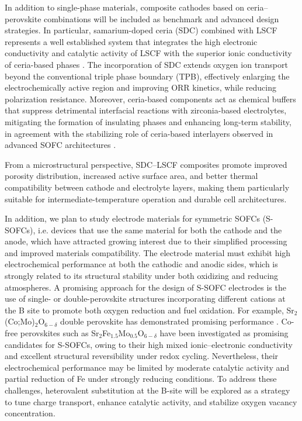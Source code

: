 In addition to single-phase materials, composite cathodes based on ceria–perovskite combinations will be included as benchmark and advanced design strategies. In particular, samarium-doped ceria (SDC) combined with LSCF represents a well established system that integrates the high electronic conductivity and catalytic activity of LSCF with the superior ionic conductivity of ceria-based phases \cite{MARINHA2012,SHIMURA2017}. The incorporation of SDC extends oxygen ion transport beyond the conventional triple phase boundary (TPB), effectively enlarging the electrochemically active region and improving ORR kinetics, while reducing polarization resistance. Moreover, ceria-based components act as chemical buffers that suppress detrimental interfacial reactions with zirconia-based electrolytes, mitigating the formation of insulating phases and enhancing long-term stability, in agreement with the stabilizing role of ceria-based interlayers observed in advanced SOFC architectures \cite{KAN2016,TAO2009}.

From a microstructural perspective, SDC–LSCF composites promote improved porosity distribution, increased active surface area, and better thermal compatibility between cathode and electrolyte layers, making them particularly suitable for intermediate-temperature operation and durable cell architectures.

In addition, we plan to study electrode materials for symmetric SOFCs (S-SOFCs), i.e. devices that use the same material for both the cathode and the anode, which have attracted growing interest due to their simplified processing and improved materials compatibility. The electrode material must exhibit high electrochemical performance at both the cathodic and anodic sides, which is strongly related to its structural stability under both oxidizing and reducing atmospheres. A promising approach for the design of S-SOFC electrodes is the use of single- or double-perovskite structures incorporating different cations at the B site to promote both oxygen reduction and fuel oxidation. For example, Sr$_2$(Co;Mo)$_2$O$_{6 -\delta}$ double perovskite has demonstrated promising performance \cite{Diego2024}. Co-free perovskites such as Sr$_{2}$Fe$_{1.5}$Mo$_{0.5}$O$_{6 -\delta}$ have been investigated as promising candidates for S-SOFCs, owing to their high mixed ionic–electronic conductivity and excellent structural reversibility under redox cycling. Nevertheless, their electrochemical performance may be limited by moderate catalytic activity and partial reduction of Fe under strongly reducing conditions. To address these challenges, heterovalent substitution at the B-site will be explored as a strategy to tune charge transport, enhance catalytic activity, and stabilize oxygen vacancy concentration.

